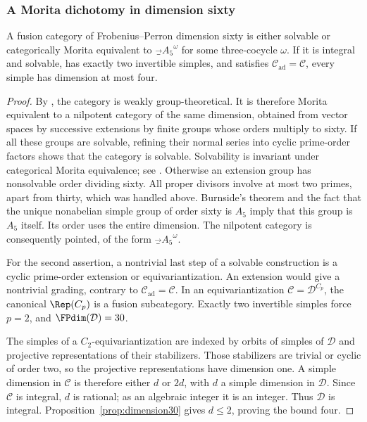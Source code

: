 \subsubsection{A Morita dichotomy in dimension sixty}
\begin{lemma}\label{lem:sixty-dichotomy}
A fusion category of Frobenius--Perron dimension sixty is either solvable
or categorically Morita equivalent to $\Vec_{A_5}^{\omega}$ for some
three-cocycle $\omega$.
If it is integral and solvable, has exactly two invertible simples, and
satisfies $\mathcal C_{\mathrm{ad}}=\mathcal C$, every simple has dimension
at most four.
\end{lemma}
\begin{proof}
By \cite[Theorem~9.16]{ENOWGT}, the category is weakly group-theoretical.
It is therefore Morita equivalent to a nilpotent category of the same
dimension, obtained from vector spaces by successive extensions by
finite groups whose orders multiply to sixty. If all these groups are
solvable, refining their normal series into cyclic prime-order factors
shows that the category is solvable. Solvability is invariant under
categorical Morita equivalence; see \cite[Section~4.2]{ENOWGT}.
Otherwise an extension group has nonsolvable order dividing sixty.
All proper divisors involve at most two primes, apart from thirty,
which was handled above. Burnside's theorem and the fact that the unique
nonabelian simple group of order sixty is $A_5$ imply that this group is
$A_5$ itself. Its order uses the entire dimension. The nilpotent category
is consequently pointed, of the form $\Vec_{A_5}^{\omega}$.

For the second assertion, a nontrivial last step of a solvable
construction is a cyclic prime-order extension or equivariantization.
An extension would give a nontrivial grading, contrary to
$\mathcal C_{\mathrm{ad}}=\mathcal C$. In an equivariantization
$\mathcal C=\mathcal D^{C_p}$, the canonical $\Rep(C_p)$ is a fusion
subcategory. Exactly two invertible simples force $p=2$, and
$\FPdim(\mathcal D)=30$.

The simples of a $C_2$-equivariantization are indexed by orbits of simples
of $\mathcal D$ and projective representations of their stabilizers.
Those stabilizers are trivial or cyclic of order two, so the projective
representations have dimension one. A simple dimension in $\mathcal C$
is therefore either $d$ or $2d$, with $d$ a simple dimension in
$\mathcal D$. Since $\mathcal C$ is integral, $d$ is rational; as an
algebraic integer it is an integer. Thus $\mathcal D$ is integral.
Proposition~\ref{prop:dimension30} gives $d\leq2$, proving the bound four.
\end{proof}

